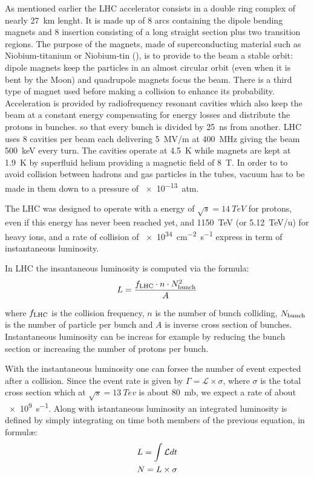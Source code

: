 As mentioned earlier the LHC accelerator consists in a double ring complex of nearly \SI{27}{km} lenght. It is made up of 8 arcs containing the dipole bending magnets and 8 insertion consisting of a long straight section plus two transition regions. The purpose of the magnets, made of superconducting material such as Niobium-titanium or Niobium-tin (), is to provide to the beam a stable orbit: dipole magnets keep the particles in an almost circular orbit (even when it is bent by the Moon) and quadrupole magnets focus the beam. There is a third type of magnet used before making a collision to enhance its probability. Acceleration is provided by radiofrequency resonant cavities which also keep the beam at a constant energy compensating for energy losses and distribute the protons in bunches. so that every bunch is divided by \SI{25}{ns} from another. LHC uses 8 cavities per beam each delivering \SI{5}{MV/m} at \SI{400}{MHz} giving the beam \SI{500}{keV} every turn. The cavities operate at \SI{4.5}{K} while magnets are kept at \SI{1.9}{K} by superfluid helium providing a magnetic field of \SI{8}{T}.
In order to to avoid collision between hadrons and gas particles in the tubes, vacuum has to be made in them down to a pressure of \SI{e-13}{atm}.

The LHC was designed to operate with a \cm energy of $\sqrt{s}=\SI{14}{TeV} $ for protons, even if this energy has never been reached yet, and \SI{1150}{TeV} (or \SI{5.12}{TeV/u}) for heavy ions, and a rate of collision of \SI{e34}{cm^{-2}.s^{-1}} express in term of instantaneous luminosity. 

In LHC the insantaneous luminosity is computed via the formula:
\begin{equation}
	L=\frac{f_{\textup{LHC}} \cdot n \cdot N_{\textup{bunch}}^2}{A}
\end{equation}

where $f_{\textup{LHC}}$ is the collision frequency, $n$ is the number of bunch colliding, $N_{\textup{bunch}}$ is the number of particle per bunch and $A$ is inverse cross section of bunches. Instantaneous luminosity can be increas for example by reducing the bunch section or increasing the number of protons per bunch.

With the instantaneous luminosity one can forsee the number of event expected after a collision. Since the event rate is given by $\Gamma=\mathcal{L}\times\sigma$, where $\sigma$ is the total \pp cross section which at $\sqrt{s}=\SI{13}{Tev}$ is about \SI{80}{mb}, we expect a rate of about \SI{e9}{s^{-1}}. Along with istantaneous luminosity an integrated luminosity is defined by simply integrating on time both members of the previous equation, in formul\ae:
\begin{gather}
	L=\int{\mathcal{L}dt} \notag\\
	N=L\times\sigma
\end{gather} 

